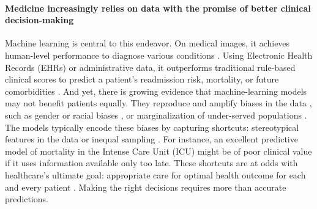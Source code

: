 \documentclass[french,12pt,twoside,a4paper]{book}
\begin{document}
\paragraph{Medicine increasingly relies on data with the promise of better
  clinical decision-making} Machine learning is central to this endeavor.
On medical images, it achieves human-level performance to
diagnose various conditions
\citep{aggarwal2021diagnostic,esteva2021deep,liu2019comparison}.
Using Electronic Health Records (EHRs) or administrative data, it
outperforms traditional rule-based clinical scores to predict a patient's
readmission risk, mortality, or future comorbidities
\citep{rajkomar2018scalable,li2020behrt,beaulieu2021machine}.
%
And yet, there is growing evidence that machine-learning models may not benefit
patients equally. They reproduce and amplify biases in the data
\citep{rajkomar2018ensuring}, such as gender or racial biases
\citep{singh2022generalizability,gichoya2022ai,roosli2022peeking},
or marginalization of under-served populations
\citep{seyyed2021underdiagnosis}. The models
typically encode these biases by capturing shortcuts: stereotypical features in the data or inequal sampling \citep{geirhos2020shortcut,winkler2019association,degrave2021ai}.
%
For instance, an excellent predictive model of mortality in the Intense Care Unit
(ICU) might be of poor clinical value if it uses information available
only too late.
%
These shortcuts are at odds with healthcare's ultimate goal: appropriate care
for optimal health outcome for each and every patient
\citep{cma_policy_appropriateness_2015, ghassemi2020review}. Making the right decisions requires more than accurate predictions.
\end{document}
